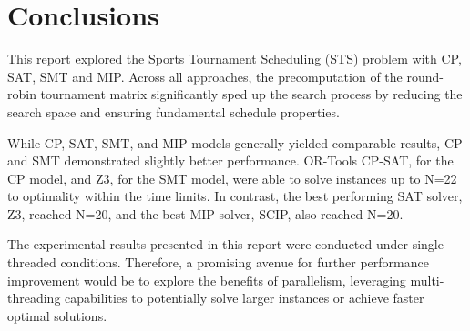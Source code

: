 \section{Conclusions}
This report explored the Sports Tournament Scheduling (STS) problem with CP, SAT, SMT and MIP. Across all approaches, the precomputation of the round-robin tournament matrix significantly sped up the search process by reducing the search space and ensuring fundamental schedule properties.

While CP, SAT, SMT, and MIP models generally yielded comparable results, CP and SMT demonstrated slightly better performance. OR-Tools CP-SAT, for the  CP model, and Z3, for the SMT model, were able to solve instances up to N=22 to optimality within the time limits. In contrast, the best performing SAT solver, Z3, reached N=20, and the best MIP solver, SCIP, also reached N=20.

The experimental results presented in this report were conducted under single-threaded conditions. Therefore, a promising avenue for further performance improvement would be to explore the benefits of parallelism, leveraging multi-threading capabilities to potentially solve larger instances or achieve faster optimal solutions.